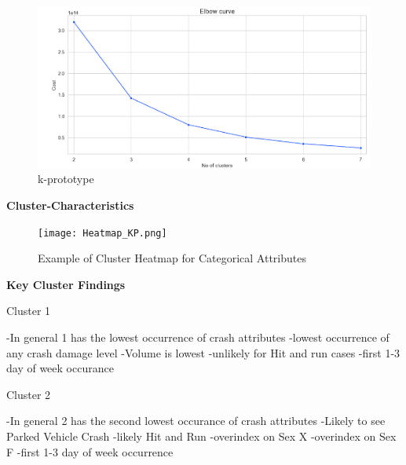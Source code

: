 \documentclass[conference]{IEEEtran}
\begin{document}
\begin{center}
 \begin{figure}[!h]
	\includegraphics[width=\linewidth]{KPrototype_Elbow.png}
	\caption{k-prototype}
	\label{fig: kprototype elbow chart}
 \end{figure}

\textbf{Cluster-Characteristics} \linebreak

\begin{figure}[!h]
	\texttt{[image: Heatmap\_KP.png]}
	\caption{Example of Cluster Heatmap for Categorical Attributes }
	\label{fig: Cluster Heatmap for Categorical Attributes (4 Clusters)}
\end{figure}


\begin{center} 
	\textbf{Key Cluster Findings} 
	\end{center}
	Cluster 1 \linebreak
	\begin{flushleft}
-In general 1 has the lowest occurrence of crash attributes\linebreak
-lowest occurrence of any crash damage level \linebreak
-Volume is lowest \linebreak
-unlikely for Hit and run cases \linebreak
-first 1-3 day of week occurance \linebreak
	\end{flushleft}

Cluster 2 \linebreak
\begin{flushleft}
-In general 2 has the second lowest occurance of crash attributes \linebreak
-Likely to see Parked Vehicle Crash\linebreak
-likely Hit and Run\linebreak
-overindex on Sex X\linebreak
-overindex on Sex F\linebreak
-first 1-3 day of week occurrence\linebreak
\end{flushleft}


\end{center}
\end{document}
